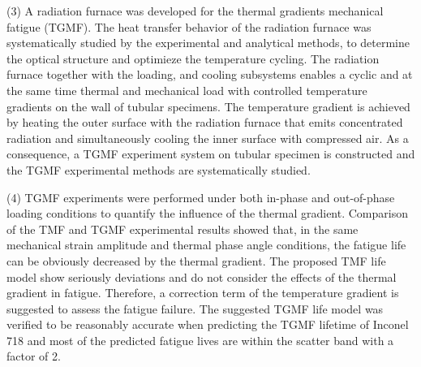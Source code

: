 (3) A radiation furnace was developed for the thermal gradients mechanical fatigue (TGMF). The heat transfer behavior of the radiation furnace was systematically studied by the experimental and analytical methods, to determine the optical structure and optimieze the temperature cycling. The radiation furnace together with the loading, and cooling subsystems enables a cyclic and at the same time thermal and mechanical load with controlled temperature gradients on the wall of tubular specimens. The temperature gradient is achieved by heating the outer surface with the radiation furnace that emits concentrated radiation and simultaneously cooling the inner surface with compressed air. As a consequence, a TGMF experiment system on tubular specimen is constructed and the TGMF experimental methods are systematically studied. 

(4) TGMF experiments were performed under both in-phase and out-of-phase loading conditions to quantify the influence of the thermal gradient. Comparison of the TMF and TGMF experimental results showed that, in the same mechanical strain amplitude and thermal phase angle conditions, the fatigue life can be obviously decreased by the thermal gradient. The proposed TMF life model show seriously deviations and do not consider the effects of the thermal gradient in fatigue. Therefore, a correction term of the temperature gradient is suggested to assess the fatigue failure. The suggested TGMF life model was verified to be reasonably accurate when predicting the TGMF lifetime of Inconel 718 and most of the predicted fatigue lives are within the scatter band with a factor of 2.
